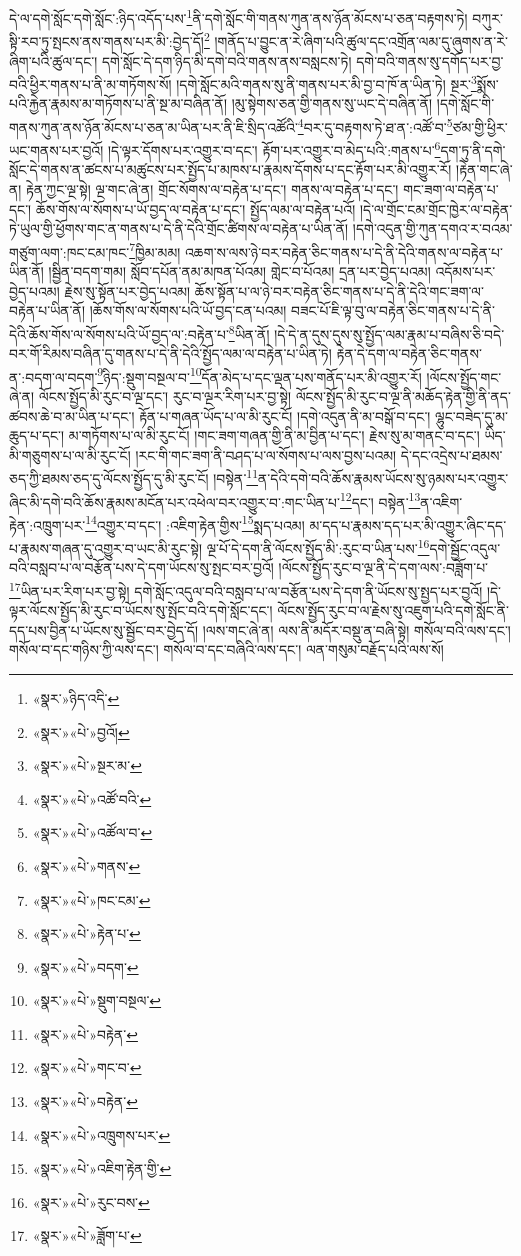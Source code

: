 དེ་ལ་དགེ་སློང་དགེ་སློང་:ཉིད་འདོད་པས་\footnote{«སྣར་»ཉིད་འདི་}ནི་དགེ་སློང་གི་གནས་ཀུན་ནས་ཉོན་མོངས་པ་ཅན་བརྟགས་ཏེ། བཀུར་སྟི་རབ་ཏུ་སྤངས་ནས་གནས་པར་མི་:བྱེད་དོ།\footnote{«སྣར་»«པེ་»བྱའོ།} །གནོད་པ་བྱུང་ན་རེ་ཞིག་པའི་ཚུལ་དང་འགྲོན་ལམ་དུ་ཞུགས་ན་རེ་ཞིག་པའི་ཚུལ་དང་། དགེ་སློང་དེ་དག་ཉིད་མི་དགེ་བའི་གནས་ནས་བསླངས་ཏེ། དགེ་བའི་གནས་སུ་དགོད་པར་བྱ་བའི་ཕྱིར་གནས་པ་ནི་མ་གཏོགས་སོ། །དགེ་སློང་མའི་གནས་སུ་ནི་གནས་པར་མི་བྱ་བ་ཁོ་ན་ཡིན་ཏེ། སྔར་\footnote{«སྣར་»«པེ་»སྔར་མ་}སྨོས་པའི་རྐྱེན་རྣམས་མ་གཏོགས་པ་ནི་སྔ་མ་བཞིན་ནོ། །མུ་སྟེགས་ཅན་གྱི་གནས་སུ་ཡང་དེ་བཞིན་ནོ། །དགེ་སློང་གི་གནས་ཀུན་ནས་ཉོན་མོངས་པ་ཅན་མ་ཡིན་པར་ནི་ཇི་སྲིད་འཚོའི་\footnote{«སྣར་»«པེ་»འཚོ་བའི་}བར་དུ་བརྟགས་ཏེ་ཐ་ན་:འཚོ་བ་\footnote{«སྣར་»«པེ་»འཚོལ་བ་}ཙམ་གྱི་ཕྱིར་ཡང་གནས་པར་བྱའོ། །དེ་ལྟར་དོགས་པར་འགྱུར་བ་དང་། རྟོག་པར་འགྱུར་བ་མེད་པའི་:གནས་པ་\footnote{«སྣར་»«པེ་»གནས་}དག་ཏུ་ནི་དགེ་སློང་དེ་གནས་ན་ཚངས་པ་མཚུངས་པར་སྤྱོད་པ་མཁས་པ་རྣམས་དོགས་པ་དང་རྟོག་པར་མི་འགྱུར་རོ། །རྟེན་གང་ཞེ་ན། རྟེན་ཀྱང་ལྔ་སྟེ། ལྔ་གང་ཞེ་ན། གྲོང་སོགས་ལ་བརྟེན་པ་དང་། གནས་ལ་བརྟེན་པ་དང་། གང་ཟག་ལ་བརྟེན་པ་དང་། ཆོས་གོས་ལ་སོགས་པ་ཡོ་བྱད་ལ་བརྟེན་པ་དང་། སྤྱོད་ལམ་ལ་བརྟེན་པའོ། །དེ་ལ་གྲོང་ངམ་གྲོང་ཁྱེར་ལ་བརྟེན་ཏེ་ཡུལ་གྱི་ཕྱོགས་གང་ན་གནས་པ་དེ་ནི་དེའི་གྲོང་ཚིགས་ལ་བརྟེན་པ་ཡིན་ནོ། །དགེ་འདུན་གྱི་ཀུན་དགའ་ར་བའམ་གཙུག་ལག་:ཁང་ངམ་ཁང་\footnote{«སྣར་»«པེ་»ཁང་ངམ་}ཁྱིམ་མམ། འཆག་ས་ལས་ཉེ་བར་བརྟེན་ཅིང་གནས་པ་དེ་ནི་དེའི་གནས་ལ་བརྟེན་པ་ཡིན་ནོ། །སྦྱིན་བདག་གམ། སློབ་དཔོན་ནམ་མཁན་པོའམ། གླེང་བ་པོའམ། དྲན་པར་བྱེད་པའམ། འདོམས་པར་བྱེད་པའམ། རྗེས་སུ་སྟོན་པར་བྱེད་པའམ། ཆོས་སྟོན་པ་ལ་ཉེ་བར་བརྟེན་ཅིང་གནས་པ་དེ་ནི་དེའི་གང་ཟག་ལ་བརྟེན་པ་ཡིན་ནོ། །ཆོས་གོས་ལ་སོགས་པའི་ཡོ་བྱད་ངན་པའམ། བཟང་པོ་ཇི་ལྟ་བུ་ལ་བརྟེན་ཅིང་གནས་པ་དེ་ནི་དེའི་ཆོས་གོས་ལ་སོགས་པའི་ཡོ་བྱད་ལ་:བརྟེན་པ་\footnote{«སྣར་»«པེ་»རྟེན་པ་}ཡིན་ནོ། །དེ་དེ་ན་དུས་དུས་སུ་སྤྱོད་ལམ་རྣམ་པ་བཞིས་ཅི་བདེ་བར་གོ་རིམས་བཞིན་དུ་གནས་པ་དེ་ནི་དེའི་སྤྱོད་ལམ་ལ་བརྟེན་པ་ཡིན་ཏེ། རྟེན་དེ་དག་ལ་བརྟེན་ཅིང་གནས་ན་:བདག་ལ་བདག་\footnote{«སྣར་»«པེ་»བདག་}ཉིད་:སྡུག་བསྔལ་བ་\footnote{«སྣར་»«པེ་»སྡུག་བསྔལ་}དོན་མེད་པ་དང་ལྡན་པས་གནོད་པར་མི་འགྱུར་རོ། །ལོངས་སྤྱོད་གང་ཞེ་ན། ལོངས་སྤྱོད་མི་རུང་བ་ལྔ་དང་། རུང་བ་ལྔར་རིག་པར་བྱ་སྟེ། ལོངས་སྤྱོད་མི་རུང་བ་ལྔ་ནི་མཆོད་རྟེན་གྱི་ནི་ནད་ཚབས་ཆེ་བ་མ་ཡིན་པ་དང་། རྟོན་པ་གཞན་ཡོད་པ་ལ་མི་རུང་ངོ། །དགེ་འདུན་ནི་མ་བསྒོ་བ་དང་། ལྷུང་བཟེད་དུ་མ་ཆུད་པ་དང་། མ་གཏོགས་པ་ལ་མི་རུང་ངོ། །གང་ཟག་གཞན་གྱི་ནི་མ་བྱིན་པ་དང་། རྗེས་སུ་མ་གནང་བ་དང་། ཡིད་མི་གཅུགས་པ་ལ་མི་རུང་ངོ། །རང་གི་གང་ཟག་ནི་བཤད་པ་ལ་སོགས་པ་ལས་བྱས་པའམ། དེ་དང་འདྲེས་པ་ཐམས་ཅད་ཀྱི་ཐམས་ཅད་དུ་ལོངས་སྤྱོད་དུ་མི་རུང་ངོ། །བསྟེན་\footnote{«སྣར་»«པེ་»བརྟེན་}ན་དེའི་དགེ་བའི་ཆོས་རྣམས་ཡོངས་སུ་ཉམས་པར་འགྱུར་ཞིང་མི་དགེ་བའི་ཆོས་རྣམས་མངོན་པར་འཕེལ་བར་འགྱུར་བ་:གང་ཡིན་པ་\footnote{«སྣར་»«པེ་»གང་བ་}དང་། བསྟེན་\footnote{«སྣར་»«པེ་»བརྟེན་}ན་འཇིག་རྟེན་:འཁྲུག་པར་\footnote{«སྣར་»«པེ་»འཁྲུགས་པར་}འགྱུར་བ་དང་། :འཇིག་རྟེན་གྱིས་\footnote{«སྣར་»«པེ་»འཇིག་རྟེན་གྱི་}སྨད་པའམ། མ་དད་པ་རྣམས་དད་པར་མི་འགྱུར་ཞིང་དད་པ་རྣམས་གཞན་དུ་འགྱུར་བ་ཡང་མི་རུང་སྟེ། ལྔ་པོ་དེ་དག་ནི་ལོངས་སྤྱོད་མི་:རུང་བ་ཡིན་པས་\footnote{«སྣར་»«པེ་»རུང་བས་}དགེ་སྦྱོང་འདུལ་བའི་བསླབ་པ་ལ་བརྩོན་པས་དེ་དག་ཡོངས་སུ་སྤང་བར་བྱའོ། །ལོངས་སྤྱོད་རུང་བ་ལྔ་ནི་དེ་དག་ལས་:བཟློག་པ་\footnote{«སྣར་»«པེ་»ཟློག་པ་}ཡིན་པར་རིག་པར་བྱ་སྟེ། དགེ་སློང་འདུལ་བའི་བསླབ་པ་ལ་བརྩོན་པས་དེ་དག་ནི་ཡོངས་སུ་སྤྱད་པར་བྱའོ། །དེ་ལྟར་ལོངས་སྤྱོད་མི་རུང་བ་ཡོངས་སུ་སྤོང་བའི་དགེ་སློང་དང་། ལོངས་སྤྱོད་རུང་བ་ལ་རྗེས་སུ་འཇུག་པའི་དགེ་སློང་ནི་དད་པས་བྱིན་པ་ཡོངས་སུ་སྦྱོང་བར་བྱེད་དོ། །ལས་གང་ཞེ་ན། ལས་ནི་མདོར་བསྡུ་ན་བཞི་སྟེ། གསོལ་བའི་ལས་དང་། གསོལ་བ་དང་གཉིས་ཀྱི་ལས་དང་། གསོལ་བ་དང་བཞིའི་ལས་དང་། ལན་གསུམ་བརྗོད་པའི་ལས་སོ། 